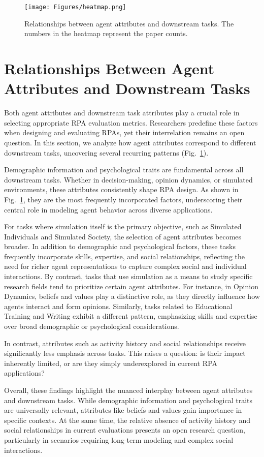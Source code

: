 
\begin{figure}[t]
    \centering
    \texttt{[image: Figures/heatmap.png]}
    \caption{Relationships between agent attributes and downstream tasks. The numbers in the heatmap represent the paper counts.}
    \label{fig:heatmap}
\end{figure}

\section{Relationships Between Agent Attributes and Downstream Tasks}




Both agent attributes and downstream task attributes play a crucial role in selecting appropriate RPA evaluation metrics. Researchers predefine these factors when designing and evaluating RPAs, yet their interrelation remains an open question.  In this section, we analyze how agent attributes correspond to different downstream tasks, uncovering several recurring patterns (Fig.~\ref{fig:heatmap}).

Demographic information and psychological traits are fundamental across all downstream tasks. Whether in decision-making, opinion dynamics, or simulated environments, these attributes consistently shape RPA design. As shown in Fig.~\ref{fig:heatmap}, they are the most frequently incorporated factors, underscoring their central role in modeling agent behavior across diverse applications.

For tasks where simulation itself is the primary objective, such as Simulated Individuals and Simulated Society, the selection of agent attributes becomes broader. In addition to demographic and psychological factors, these tasks frequently incorporate skills, expertise, and social relationships, reflecting the need for richer agent representations to capture complex social and individual interactions. By contrast, tasks that use simulation as a means to study specific research fields tend to prioritize certain agent attributes. For instance, in Opinion Dynamics, beliefs and values play a distinctive role, as they directly influence how agents interact and form opinions. Similarly, tasks related to Educational Training and Writing exhibit a different pattern, emphasizing skills and expertise over broad demographic or psychological considerations.

In contrast, attributes such as activity history and social relationships receive significantly less emphasis across tasks. This raises a question: is their impact inherently limited, or are they simply underexplored in current RPA applications?

Overall, these findings highlight the nuanced interplay between agent attributes and downstream tasks. While demographic information and psychological traits are universally relevant, attributes like beliefs and values gain importance in specific contexts. At the same time, the relative absence of activity history and social relationships in current evaluations presents an open research question, particularly in scenarios requiring long-term modeling and complex social interactions.
